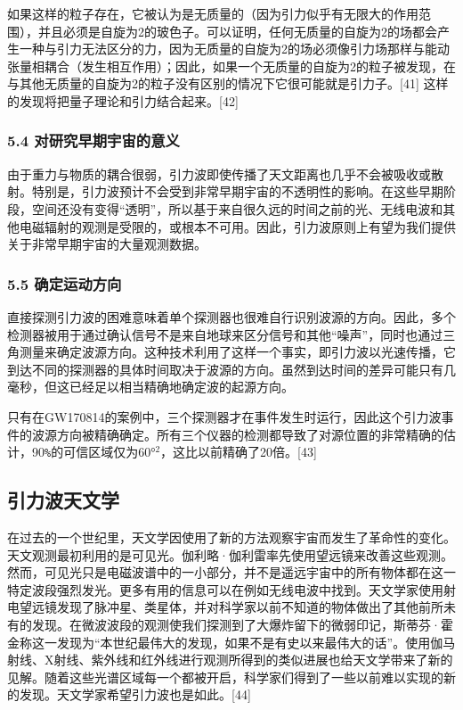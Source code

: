 如果这样的粒子存在，它被认为是无质量的（因为引力似乎有无限大的作用范围），并且必须是自旋为2的玻色子。可以证明，任何无质量的自旋为2的场都会产生一种与引力无法区分的力，因为无质量的自旋为2的场必须像引力场那样与能动张量相耦合（发生相互作用）；因此，如果一个无质量的自旋为2的粒子被发现，在与其他无质量的自旋为2的粒子没有区别的情况下它很可能就是引力子。[41] 这样的发现将把量子理论和引力结合起来。[42]

\subsubsection{5.4 对研究早期宇宙的意义}

由于重力与物质的耦合很弱，引力波即使传播了天文距离也几乎不会被吸收或散射。特别是，引力波预计不会受到非常早期宇宙的不透明性的影响。在这些早期阶段，空间还没有变得“透明”，所以基于来自很久远的时间之前的光、无线电波和其他电磁辐射的观测是受限的，或根本不可用。因此，引力波原则上有望为我们提供关于非常早期宇宙的大量观测数据。

\subsubsection{5.5 确定运动方向}

直接探测引力波的困难意味着单个探测器也很难自行识别波源的方向。因此，多个检测器被用于通过确认信号不是来自地球来区分信号和其他“噪声”，同时也通过三角测量来确定波源方向。这种技术利用了这样一个事实，即引力波以光速传播，它到达不同的探测器的具体时间取决于波源的方向。虽然到达时间的差异可能只有几毫秒，但这已经足以相当精确地确定波的起源方向。

只有在GW170814的案例中，三个探测器才在事件发生时运行，因此这个引力波事件的波源方向被精确确定。所有三个仪器的检测都导致了对源位置的非常精确的估计，90\verb`%`的可信区域仅为60°$^{2}$，这比以前精确了20倍。[43]

\subsection{引力波天文学}

在过去的一个世纪里，天文学因使用了新的方法观察宇宙而发生了革命性的变化。天文观测最初利用的是可见光。伽利略·伽利雷率先使用望远镜来改善这些观测。然而，可见光只是电磁波谱中的一小部分，并不是遥远宇宙中的所有物体都在这一特定波段强烈发光。更多有用的信息可以在例如无线电波中找到。天文学家使用射电望远镜发现了脉冲星、类星体，并对科学家以前不知道的物体做出了其他前所未有的发现。在微波波段的观测使我们探测到了大爆炸留下的微弱印记，斯蒂芬·霍金称这一发现为“本世纪最伟大的发现，如果不是有史以来最伟大的话”。使用伽马射线、X射线、紫外线和红外线进行观测所得到的类似进展也给天文学带来了新的见解。随着这些光谱区域每一个都被开启，科学家们得到了一些以前难以实现的新的发现。天文学家希望引力波也是如此。[44]

